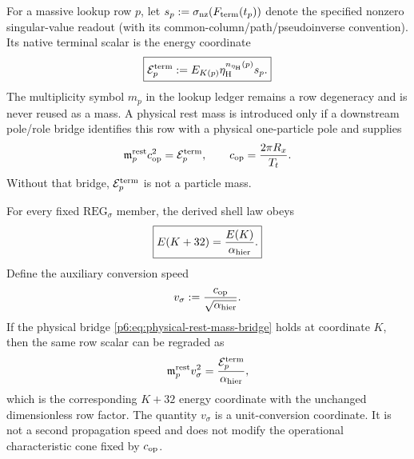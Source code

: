 \documentclass[12pt,a4paper]{article}
\newcommand{\etaH}{\eta_{\rm H}}
\begin{document}
\begin{definition}
\label{p6:def:typed-terminal-row-energy}
For a massive lookup row \(p\), let
\(s_p:=\sigma_{\rm nz}(F_{\rm term}(t_p))\) denote the specified nonzero
singular-value readout (with its common-column/path/pseudoinverse convention).
Its native terminal scalar is the energy coordinate
\begin{equation}
 \label{p6:eq:typed-terminal-row-energy}
 \boxed{\mathcal E_p^{\rm term}
 :=E_{K(p)}\etaH^{n_{\etaH}(p)}s_p.}
\end{equation}
The multiplicity symbol \(m_p\) in the lookup ledger remains a row
degeneracy and is never reused as a mass.  A physical rest mass is introduced
only if a downstream pole/role bridge identifies this row with a physical
one-particle pole and supplies
\begin{equation}
 \label{p6:eq:physical-rest-mass-bridge}
 \mathfrak m_p^{\rm rest}c_{\rm op}^{2}=\mathcal E_p^{\rm term},
 \qquad c_{\rm op}=\frac{2\pi R_x}{T_t}.
\end{equation}
Without that bridge, \(\mathcal E_p^{\rm term}\) is not a particle mass.
\end{definition}

\begin{corollary}
\label{p6:cor:one-alpha-mass-regrading}
For every fixed \(\mathrm{REG}_\sigma\) member, the derived shell law obeys
\begin{equation}
 \label{p6:eq:one-alpha-shell-shift}
 \boxed{E(K+32)=\frac{E(K)}{\alpha_{\rm hier}}.}
\end{equation}
Define the auxiliary conversion speed
\begin{equation}
 \label{p6:eq:auxiliary-conversion-speed}
 v_\sigma:=\frac{c_{\rm op}}{\sqrt{\alpha_{\rm hier}}}.
\end{equation}
If the physical bridge \eqref{p6:eq:physical-rest-mass-bridge} holds at
coordinate \(K\), then the same row scalar can be regraded as
\begin{equation}
 \label{p6:eq:one-alpha-mass-regrading}
 \mathfrak m_p^{\rm rest}v_\sigma^2
 =\frac{\mathcal E_p^{\rm term}}{\alpha_{\rm hier}},
\end{equation}
which is the corresponding \(K+32\) energy coordinate with the unchanged
dimensionless row factor.  The quantity \(v_\sigma\) is a unit-conversion
coordinate.  It is not a second propagation speed and does not modify the
operational characteristic cone fixed by \(c_{\rm op}\).
\end{corollary}
\end{document}
